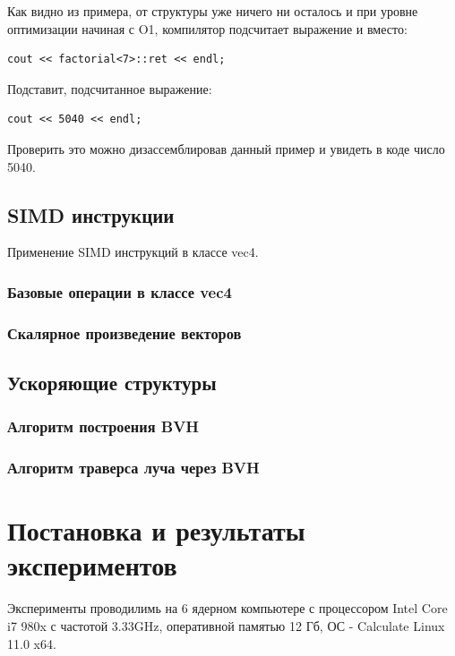 \documentclass[12pt, a4paper]{article}
\begin{document}
Как видно из примера, от структуры уже ничего ни осталось и при уровне оптимизации начиная с O1, компилятор подсчитает выражение и вместо:
\begin{verbatim}
cout << factorial<7>::ret << endl;
\end{verbatim}
Подставит, подсчитанное выражение:
\begin{verbatim}
cout << 5040 << endl;
\end{verbatim}
Проверить это можно дизассемблировав данный пример и увидеть в коде число 5040.

\subsection{SIMD инструкции}
Применение SIMD инструкций в классе vec4.
\subsubsection{Базовые операции в классе vec4}

\subsubsection{Скалярное произведение векторов}

\subsection{Ускоряющие структуры}

\subsubsection{Алгоритм построения BVH}

\subsubsection{Алгоритм траверса луча через BVH}


\newpage
\section{Постановка и результаты экспериментов}

Эксперименты проводилимь на 6 ядерном компьютере с процессором Intel Core i7 980x с частотой 3.33GHz, оперативной памятью 12 Гб, ОС - Calculate Linux 11.0 x64. 
\end{document}

